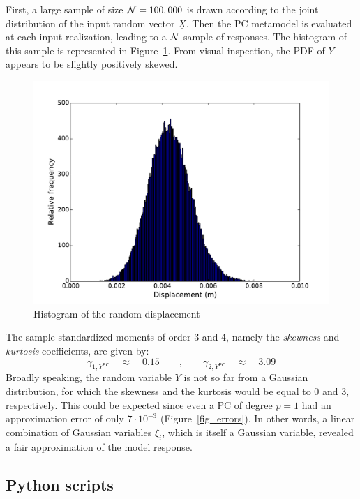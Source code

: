 \documentclass[11pt]{article}
\begin{document}
First, a large sample of size ${\mathcal N} = 100,000$ is drawn according to the joint distribution of the input random vector $\underline{X}$. Then the PC metamodel is evaluated at each input realization, leading to a ${\mathcal N}$-sample of responses. The histogram of this sample is represented in Figure~\ref{fig_histo}. From visual inspection, the PDF of $Y$ appears to be slightly positively skewed. \\

\begin{figure}[Hhbtp]
  \begin{center}
    \includegraphics[width=12cm]{Figures/Truss_histo.pdf}
  \end{center}
  \caption{Histogram of the random displacement}
  \label{fig_histo}
\end{figure}

The sample standardized moments of order 3 and 4, namely the \emph{skewness} and \emph{kurtosis} coefficients, are given by:
\begin{equation}
  \gamma_{1,Y^\textsf{PC}} \quad \approx \quad 0.15 \qquad , \qquad \gamma_{2,Y^\textsf{PC}} \quad \approx \quad 3.09
\end{equation}
Broadly speaking, the random variable $Y$ is not so far from a Gaussian distribution, for which the skewness and the kurtosis would be equal to 0 and 3, respectively. This could be expected since even a PC of degree $p=1$ had an approximation error of only $7 \cdot 10^{-3}$ (Figure~\ref{fig_errors}). In other words, a linear combination of Gaussian variables $\xi_i$, which is itself a Gaussian variable, revealed a fair approximation of the model response.

\subsection{Python scripts}
\end{document}
